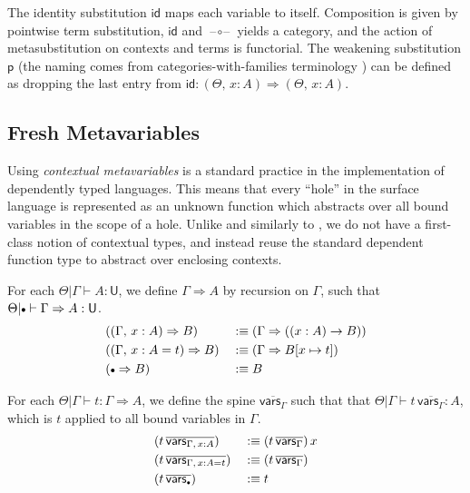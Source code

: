 \documentclass[acmsmall,review,anonymous,prologue,dvipsnames]{acmart}\settopmatter{printfolios=true,printccs=false,printacmref=false}
\renewcommand{\U}{\mathsf{U}}
\newcommand{\emptycon}{\scaleobj{.75}\bullet}
\newcommand{\To}{\Rightarrow}
\newcommand{\p}{\mathsf{p}}
\newcommand{\id}{\mathsf{id}}
\newcommand{\blank}{\mathord{\hspace{1pt}\text{--}\hspace{1pt}}}
\theoremstyle{remark}
\begin{document}

The identity substitution $\id$ maps each variable to itself. Composition is
given by pointwise term substitution, $\id$ and $\blank\circ\blank$ yields a
category, and the action of metasubstitution on contexts and terms is
functorial. The weakening substitution $\p$ (the naming comes from
categories-with-families terminology \cite{dybjer1995internal}) can be defined
as dropping the last entry from $\id : (\Theta,\,x : A) \To (\Theta,\,x : A)$.

\subsection{Fresh Metavariables}

Using \emph{contextual metavariables} is a standard practice in the
implementation of dependently typed languages. This means that every ``hole'' in
the surface language is represented as an unknown function which abstracts over
all bound variables in the scope of a hole. Unlike \cite{nanevski2008contextual}
and similarly to \cite{gundry2013type}, we do not have a first-class notion of
contextual types, and instead reuse the standard dependent function type to
abstract over enclosing contexts.

\begin{definition}\label{def:closingtype} For each $\Theta|\Gamma \vdash A : \U$, we define
$\Gamma \To A$ by recursion on $\Gamma$, such that $\Theta|\emptycon\vdash
  \Gamma \To A : \U$.
  \begin{alignat*}{3}
    &((\Gamma,\, x : A) \To B)     && :\equiv (\Gamma \To ((x : A) \to B))\\
    &((\Gamma,\, x : A = t) \To B) && :\equiv (\Gamma \To B[x\mapsto t])\\
    &(\emptycon \To B)             && :\equiv B
  \end{alignat*}
\end{definition}

\begin{definition}[Contextualization]\label{def:contextualization}
For each $\Theta|\Gamma \vdash t : \Gamma\To A$, we define the spine
$\overline{\mathsf{vars}_{\Gamma}}$ such that that $\Theta|\Gamma\vdash
t\,\overline{\mathsf{vars}_{\Gamma}} : A$, which is $t$ applied to all bound
variables in $\Gamma$.
  \begin{alignat*}{3}
    &(t\,\overline{\mathsf{vars}_{\Gamma,\,x:A}})   && :\equiv (t\,\overline{\mathsf{vars}_{\Gamma}})\,x \\
    &(t\,\overline{\mathsf{vars}_{\Gamma,\,x:A=t}}) && :\equiv (t\,\overline{\mathsf{vars}_{\Gamma}}) \\
    &(t\,\overline{\mathsf{vars}_{\emptycon}})     && :\equiv t
  \end{alignat*}
\end{definition}
\end{document}
